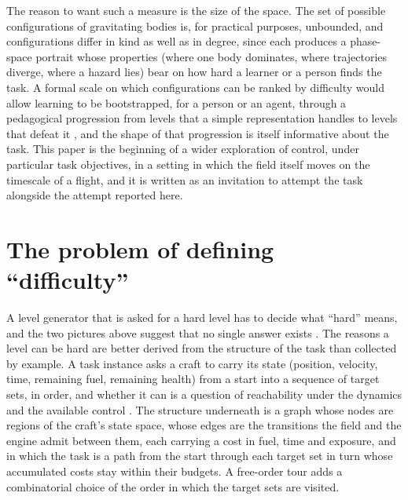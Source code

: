 \documentclass[11pt]{article}
\begin{document}
The reason to want such a measure is the size of the space. The set of
possible configurations of gravitating bodies is, for practical purposes,
unbounded, and configurations differ in kind as well as in degree, since
each produces a phase-space portrait whose properties (where one body
dominates, where trajectories diverge, where a hazard lies) bear on
how hard a learner or a person finds the task. A formal scale on which
configurations can be ranked by difficulty would allow learning to be
bootstrapped, for a person or an agent, through a pedagogical progression
from levels that a simple representation handles to levels that defeat it
\cite{bengio2009,narvekar2020}, and the shape of that progression is itself
informative about the task. This paper is the beginning of a wider
exploration of control, under particular task objectives, in a setting in
which the field itself moves on the timescale of a flight, and it is written as an invitation to attempt
the task alongside the attempt reported here.

\section{The problem of defining ``difficulty''}
\label{sec:hard}

A level generator that is asked for a hard level has to decide what
``hard'' means, and the two pictures above suggest that no single answer
exists \cite{furuta2021,dennis2020,rutherford2024}. The reasons a level can
be hard are better derived from the structure of the task than collected by
example. A task instance asks a craft to carry its state (position,
velocity, time, remaining fuel, remaining health) from a start into a
sequence of target sets, in order, and whether it can is a question of
reachability under the dynamics and the available control
\cite{mitchell2005,lavalle2006}. The structure underneath is a graph
whose nodes are regions of the craft's state space, whose edges are the
transitions the field and the engine admit between them, each carrying a
cost in fuel, time and exposure, and in which the task is a path from the
start through each target set in turn whose accumulated costs stay within
their budgets. A
free-order tour adds a combinatorial choice of the order in which the target
sets are visited.
\end{document}
